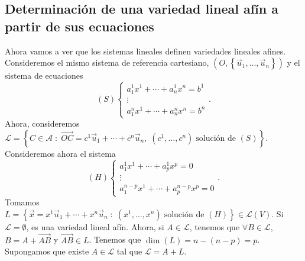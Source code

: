 \subsection*{Determinación de una variedad lineal afín a partir de sus ecuaciones}
Ahora vamos a ver que los sistemas lineales definen variedades lineales afines. Consideremos el mismo sistema de referencia cartesiano, $\displaystyle \left(O, \left\{ \vec{u}_{1}, \ldots, \vec{u}_{n}\right\} \right) $ y el sistema de ecuaciones
\[\left(S\right)
\begin{cases}
a^{1}_{1}x^{1} + \cdots + a^{1}_{n}x^{n} = b^{1} \\
\vdots \\
a^{n}_{1} x^{1} + \cdots + a^{n}_{n}x^{n} = b^{n}
\end{cases}
.\]
Ahora, consideremos $\displaystyle \mathcal{L} = \left\{ C \in \mathcal{A} \; : \; \overrightarrow{OC} = c^{1}\vec{u}_{1} + \cdots + c^{n}\vec{u}_{n}, \; \left(c^{1}, \ldots, c^{n}\right) \; \text{solución de }\left(S\right)\right\}  $. Consideremos ahora el sistema 
\[\left(H\right) 
\begin{cases}
a^{1}_{1}x^{1} + \cdots + a^{1}_{p}x^{p}= 0 \\
\vdots \\
a^{n-p}_{1}x^{1} + \cdots + a^{n-p}_{p}x^{p}= 0
\end{cases}
.\]
Tomamos $\displaystyle L = \left\{ \vec{x} = x^{1}\vec{u}_{1} + \cdots + x^{n}\vec{u}_{n} \; : \; \left(x^{1}, \ldots, x^{n}\right) \; \text{solución de }\left(H\right)\right\}  \in \mathcal{L}\left(V\right) $. Si $\displaystyle \mathcal{L} = \emptyset $, es una variedad lineal afín. Ahora, si $\displaystyle A \in \mathcal{L} $, tenemos que $\displaystyle \forall B \in \mathcal{L} $, $\displaystyle B = A + \overrightarrow{AB} $ y $\displaystyle \overrightarrow{AB} \in L $. Tenemos que $\displaystyle \dim\left(L\right) = n - \left(n-p\right) = p $. Supongamos que existe $\displaystyle A \in \mathcal{L} $ tal que $\displaystyle \mathcal{L}= A + L $.
